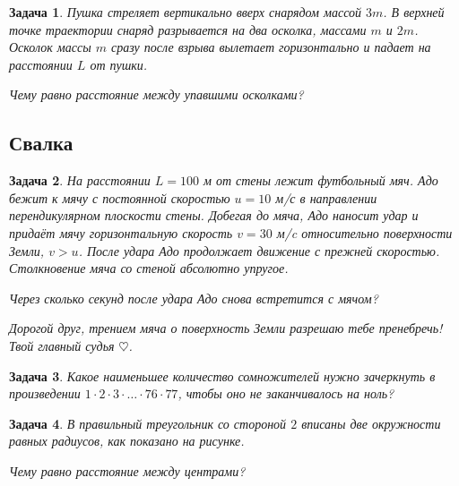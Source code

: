 \documentclass[a4paper, 11pt]{article}
\theoremstyle{break}
\newtheorem{problem}{Задача}[subsection]
\begin{document}
\begin{problem}
Пушка стреляет вертикально вверх снарядом массой $3m$.
В верхней точке траектории снаряд разрывается на два осколка, массами $m$ и $2m$.
Осколок массы $m$ сразу после взрыва вылетает горизонтально и падает на расстоянии
$L$ от пушки.

Чему равно расстояние между упавшими осколками?

\end{problem}

\subsection*{Свалка}
\setcounter{problem}{0}



\begin{problem}
На расстоянии $L=100$ м от стены лежит футбольный мяч.
Адо бежит к мячу с постоянной скоростью $u=10$ м/с в направлении перендикулярном плоскости стены.
Добегая до мяча, Адо наносит удар и придаёт
мячу горизонтальную скорость $v=30$ м/c относительно поверхности Земли, $v>u$.
После удара Адо продолжает движение с прежней скоростью. Столкновение мяча со стеной абсолютно упругое.

Через сколько секунд после удара Адо снова встретится с мячом?

Дорогой друг, трением мяча о поверхность Земли разрешаю тебе пренебречь! Твой главный судья $\heartsuit$.
\end{problem}

\begin{problem}
Какое наименьшее количество сомножителей нужно зачеркнуть
в произведении $1\cdot 2\cdot 3\cdot \ldots \cdot 76\cdot 77$, чтобы
оно не заканчивалось на ноль?

%
\end{problem}


\begin{problem}
В правильный треугольник со стороной $2$ вписаны две окружности равных радиусов, как показано на рисунке.

Чему равно расстояние между центрами?


\begin{minipage}{0.8\textwidth}
\begin{center}
\end{center}
\end{minipage}


\end{problem}
\end{document}
